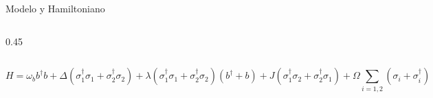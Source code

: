 \documentclass[
11pt,notheorems,hyperref={pdfauthor=whatever}
]{beamer}
\begin{document}
\begin{frame}{Modelo y Hamiltoniano}
\begin{columns}[T]
\begin{column}{0.45\textwidth}
\begin{tikzpicture}
			\end{tikzpicture}
		\end{column}
		
	\end{columns}

	\vspace{2pt}
	{\small
		\begin{equation*}
			\boxed{
				H = \omega_b b^\dagger b
				+ \Delta\!\left(\sigma_1^\dagger\sigma_1+\sigma_2^\dagger\sigma_2\right)
				+ \lambda\!\left(\sigma_1^\dagger\sigma_1+\sigma_2^\dagger\sigma_2\right)\!(b^\dagger+b)
				+ J\!\left(\sigma_1^\dagger\sigma_2+\sigma_2^\dagger\sigma_1\right)
				+ \Omega\!\sum_{i=1,2}\!\left(\sigma_i+\sigma_i^\dagger\right)
			}
		\end{equation*}
	}
	
\end{frame}
\end{document}

